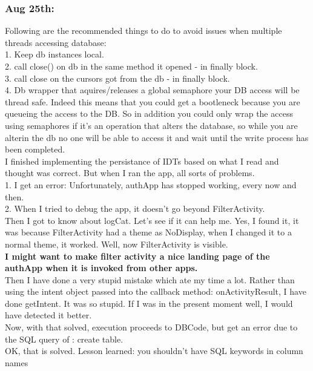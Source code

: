 \documentclass[11pt]{article}
\begin{document}
\subsubsection*{Aug 25th:}
Following are the recommended things to do to avoid issues when multiple threads accessing database:\\
1. Keep db instances local.\\
2. call close() on db in the same method it opened - in finally block.\\
3. call close on the cursors got from the db - in finally block.\\
4. Db wrapper that aquires/releases a global semaphore your DB access will be thread safe. Indeed this means that you could get a bootleneck because 
you are queueing the access to the DB. So in addition you could only wrap the access using semaphores if it's an operation that alters the database, 
so while you are alterin the db no one will be able to access it and wait until the write process has been completed.\\

I finished implementing the persistance of IDTs based on what I read and thought was correct. But when I ran the app, all sorts of problems.\\
1. I get an error: Unfortunately, authApp has stopped working, every now and then.\\
2. When I tried to debug the app, it doesn't go beyond FilterActivity.\\

Then I got to know about logCat. Let's see if it can help me. Yes, I found it, it was because FilterActivity had a theme as NoDisplay, when I changed 
it to a normal theme, it worked. Well, now FilterActivity is visible. \\
\textbf{I might want to make filter activity a nice landing page of the authApp when it is invoked from other apps.}\\

Then I have done a very stupid mistake which ate my time a lot. Rather than using the intent object passed into the callback method: 
onActivityResult, I have done getIntent. It was so stupid. If I was in the present moment well, I would have detected it better.\\

Now, with that solved, execution proceeds to DBCode, but get an error due to the SQL query of : create table.\\
OK, that is solved. Lesson learned: you shouldn't have SQL keywords in column names\\
\end{document}
